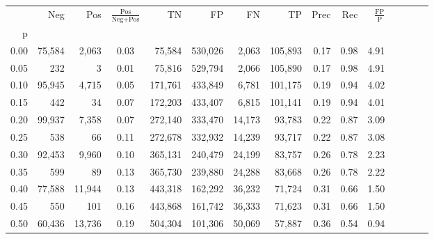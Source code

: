 \begin{tabular}{rrrcrrrrrrrrrrr}
\toprule
{} &     Neg &     Pos & $\frac{\text{Pos}}{\text{Neg}+\text{Pos}}$ &       TN &       FP &       FN &       TP &  Prec &   Rec & $\frac{\text{FP}}{\text{P}}$ \\
p    &         &         &                                            &          &          &          &          &       &       &                              \\
\midrule
0.00 &  75,584 &   2,063 &                                       0.03 &   75,584 &  530,026 &    2,063 &  105,893 &  0.17 &  0.98 &                         4.91 \\
0.05 &     232 &       3 &                                       0.01 &   75,816 &  529,794 &    2,066 &  105,890 &  0.17 &  0.98 &                         4.91 \\
0.10 &  95,945 &   4,715 &                                       0.05 &  171,761 &  433,849 &    6,781 &  101,175 &  0.19 &  0.94 &                         4.02 \\
0.15 &     442 &      34 &                                       0.07 &  172,203 &  433,407 &    6,815 &  101,141 &  0.19 &  0.94 &                         4.01 \\
0.20 &  99,937 &   7,358 &                                       0.07 &  272,140 &  333,470 &   14,173 &   93,783 &  0.22 &  0.87 &                         3.09 \\
0.25 &     538 &      66 &                                       0.11 &  272,678 &  332,932 &   14,239 &   93,717 &  0.22 &  0.87 &                         3.08 \\
0.30 &  92,453 &   9,960 &                                       0.10 &  365,131 &  240,479 &   24,199 &   83,757 &  0.26 &  0.78 &                         2.23 \\
0.35 &     599 &      89 &                                       0.13 &  365,730 &  239,880 &   24,288 &   83,668 &  0.26 &  0.78 &                         2.22 \\
0.40 &  77,588 &  11,944 &                                       0.13 &  443,318 &  162,292 &   36,232 &   71,724 &  0.31 &  0.66 &                         1.50 \\
0.45 &     550 &     101 &                                       0.16 &  443,868 &  161,742 &   36,333 &   71,623 &  0.31 &  0.66 &                         1.50 \\
0.50 &  60,436 &  13,736 &                                       0.19 &  504,304 &  101,306 &   50,069 &   57,887 &  0.36 &  0.54 &                         0.94 \\

\end{tabular}
